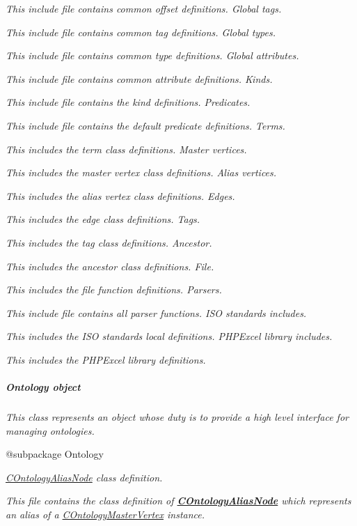 {\itshape This include file contains common offset definitions. Global tags.}

{\itshape This include file contains common tag definitions. Global types.}

{\itshape This include file contains common type definitions. Global attributes.}

{\itshape This include file contains common attribute definitions. Kinds.}

{\itshape This include file contains the kind definitions. Predicates.}

{\itshape This include file contains the default predicate definitions. Terms.}

{\itshape This includes the term class definitions. Master vertices.}

{\itshape This includes the master vertex class definitions. Alias vertices.}

{\itshape This includes the alias vertex class definitions. Edges.}

{\itshape This includes the edge class definitions. Tags.}

{\itshape This includes the tag class definitions. Ancestor.}

{\itshape This includes the ancestor class definitions. File.}

{\itshape This includes the file function definitions. Parsers.}

{\itshape This include file contains all parser functions. I\-S\-O standards includes.}

{\itshape This includes the I\-S\-O standards local definitions. P\-H\-P\-Excel library includes.}

{\itshape This includes the P\-H\-P\-Excel library definitions. \subparagraph*{Ontology object}}

{\itshape }

{\itshape This class represents an object whose duty is to provide a high level interface for managing ontologies.}

{\itshape \begin{DoxyVerb} @subpackage        Ontology\end{DoxyVerb}
}

{\itshape {\itshape \hyperlink{class_c_ontology_alias_node}{C\-Ontology\-Alias\-Node}} class definition.}

{\itshape This file contains the class definition of {\bfseries \hyperlink{class_c_ontology_alias_node}{C\-Ontology\-Alias\-Node}} which represents an alias of a \hyperlink{class_c_ontology_master_vertex}{C\-Ontology\-Master\-Vertex} instance.}

